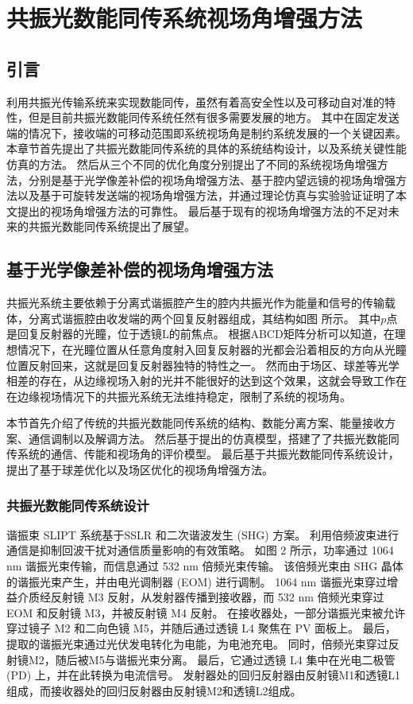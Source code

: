 \chapter{共振光数能同传系统视场角增强方法}
\label{cha:4}

\section{引言}

利用共振光传输系统来实现数能同传，虽然有着高安全性以及可移动自对准的特性，但是目前共振光数能同传系统任然有很多需要发展的地方。
其中在固定发送端的情况下，接收端的可移动范围即系统视场角是制约系统发展的一个关键因素。
本章节首先提出了共振光数能同传系统的具体的系统结构设计，以及系统关键性能仿真的方法。
然后从三个不同的优化角度分别提出了不同的系统视场角增强方法，分别是基于光学像差补偿的视场角增强方法、基于腔内望远镜的视场角增强方法以及基于可旋转发送端的视场角增强方法，并通过理论仿真与实验验证证明了本文提出的视场角增强方法的可靠性。
最后基于现有的视场角增强方法的不足对未来的共振光数能同传系统提出了展望。


\section{基于光学像差补偿的视场角增强方法}

共振光系统主要依赖于分离式谐振腔产生的腔内共振光作为能量和信号的传输载体，分离式谐振腔由收发端的两个回复反射器组成，其结构如图 所示。
其中$p$点是回复反射器的光瞳，位于透镜L的前焦点。
根据ABCD矩阵分析可以知道，在理想情况下，在光瞳位置从任意角度射入回复反射器的光都会沿着相反的方向从光瞳位置反射回来，这就是回复反射器独特的特性之一。
然而由于场区、球差等光学相差的存在，从边缘视场入射的光并不能很好的达到这个效果，这就会导致工作在在边缘视场情况下的共振光系统无法维持稳定，限制了系统的视场角。

本节首先介绍了传统的共振光数能同传系统的结构、数能分离方案、能量接收方案、通信调制以及解调方法。
然后基于提出的仿真模型，搭建了了共振光数能同传系统的通信、传能和视场角的评价模型。
最后基于共振光数能同传系统设计，提出了基于球差优化以及场区优化的视场角增强方法。


\subsection{共振光数能同传系统设计}

谐振束 SLIPT 系统基于SSLR 和二次谐波发生 (SHG) 方案。
利用倍频波束进行通信是抑制回波干扰对通信质量影响的有效策略。
如图 2 所示，功率通过 1064 nm 谐振光束传输，而信息通过 532 nm 倍频光束传输。
该倍频光束由 SHG 晶体的谐振光束产生，并由电光调制器 (EOM) 进行调制。
 1064 nm 谐振光束穿过增益介质经反射镜 M3 反射，从发射器传播到接收器，而 532 nm 倍频光束穿过 EOM 和反射镜 M3，并被反射镜 M4 反射。
 在接收器处，一部分谐振光束被允许穿过镜子 M2 和二向色镜 M5，并随后通过透镜 L4 聚焦在 PV 面板上。
 最后，提取的谐振光束通过光伏发电转化为电能，为电池充电。
 同时，倍频光束穿过反射镜M2，随后被M5与谐振光束分离。
 最后，它通过透镜 L4 集中在光电二极管 (PD) 上，并在此转换为电流信号。
 发射器处的回归反射器由反射镜M1和透镜L1组成，而接收器处的回归反射器由反射镜M2和透镜L2组成。


